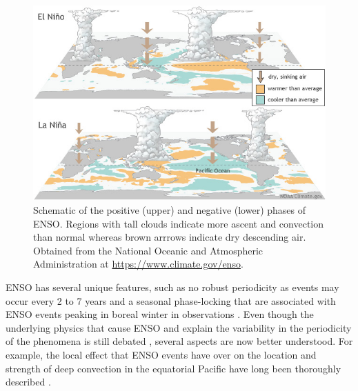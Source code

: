   
  
\begin{figure}[t!]
\centering
\includegraphics[width=\linewidth]{figures/ENSO}
\caption[El Niño Southern Oscillation and the Walker circulation]{Schematic of the positive (upper) and negative (lower) phases of ENSO. Regions with tall clouds indicate more ascent and convection than normal whereas brown arrrows indicate dry descending air. Obtained from the National Oceanic and Atmospheric Administration at \url{https://www.climate.gov/enso}. }
\label{fig:enso}
\end{figure}  

 ENSO has several unique features, such as no robust periodicity as events may occur every 2 to 7 years and a seasonal phase-locking that are associated with ENSO events peaking in boreal winter in observations \citep{wang2004}. Even though the underlying physics that cause ENSO and explain the variability in the periodicity of the phenomena is still debated \citep{wang2004,christensen2017}, several aspects are now better understood. 
For example, the local effect that ENSO events have over on the location and strength of deep convection in the equatorial Pacific have long been thoroughly described \citep{trenberth1997,neelin1998}. 

